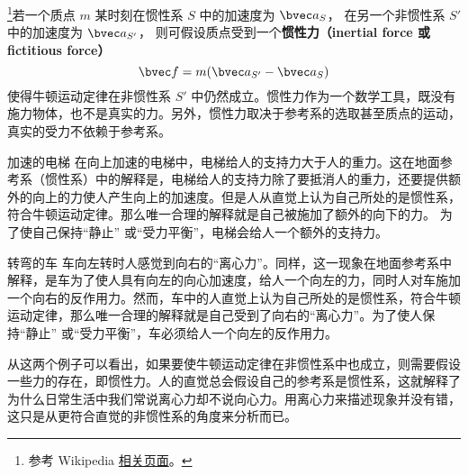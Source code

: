 

\footnote{参考 Wikipedia \href{https://en.wikipedia.org/wiki/Fictitious_force}{相关页面}。}若一个质点 $m$ 某时刻在惯性系 $S$ 中的加速度为 $\bvec a_{S}$， 在另一个非惯性系 $S'$ 中的加速度为 $\bvec a_{S'}$， 则可假设质点受到一个\textbf{惯性力（inertial force 或 fictitious force）}
\begin{equation}\label{Iner_eq1}
\bvec f = m( \bvec a_{S'} - \bvec a_{S} )
\end{equation}
使得牛顿运动定律在非惯性系 $S'$ 中仍然成立。惯性力作为一个数学工具，既没有施力物体，也不是真实的力。另外，惯性力取决于参考系的选取甚至质点的运动，真实的受力不依赖于参考系。

\begin{example}{加速的电梯}\label{Iner_ex1}
在向上加速的电梯中，电梯给人的支持力大于人的重力。这在地面参考系（惯性系）中的解释是，电梯给人的支持力除了要抵消人的重力，还要提供额外的向上的力使人产生向上的加速度。但是人从直觉上认为自己所处的是惯性系，符合牛顿运动定律。那么唯一合理的解释就是自己被施加了额外的向下的力。 为了使自己保持“静止” 或“受力平衡”，电梯会给人一个额外的支持力。
\end{example}

\begin{example}{转弯的车}
车向左转时人感觉到向右的“离心力”。同样，这一现象在地面参考系中解释，是车为了使人具有向左的向心加速度，给人一个向左的力，同时人对车施加一个向右的反作用力。然而，车中的人直觉上认为自己所处的是惯性系，符合牛顿运动定律，那么唯一合理的解释就是自己受到了向右的“离心力”。为了使人保持“静止” 或“受力平衡”，车必须给人一个向左的反作用力。
\end{example}

从这两个例子可以看出，如果要使牛顿运动定律在非惯性系中也成立，则需要假设一些力的存在，即惯性力。人的直觉总会假设自己的参考系是惯性系，这就解释了为什么日常生活中我们常说离心力却不说向心力。用离心力来描述现象并没有错，这只是从更符合直觉的非惯性系的角度来分析而已。

